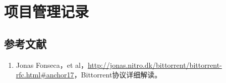\documentclass[15pt]{ctexart}
\begin{document}
   
   \section{项目管理记录} %
   \label{sec:项目管理记录}
   

    \newpage
    \appendixpage
    \begin{appendices}
        \section{参考文献} %
            \begin{enumerate}
            	\item 	Jonas Fonseca，et al，\url{http://jonas.nitro.dk/bittorrent/bittorrent-rfc.html#anchor17}，Bittorrent协议详细解读。
            \end{enumerate}
    \end{appendices}
\end{document}
